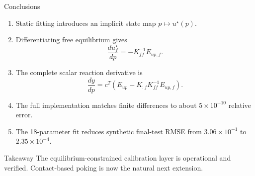 \documentclass[aspectratio=169,10pt]{beamer}
\newcommand{\Kff}{K_{\!ff}}
\newcommand{\Eup}{E_{up}}
\newcommand{\Eupf}{E_{up,f}}
\begin{document}
\begin{frame}{Conclusions}
  \small
  \begin{enumerate}
    \item Static fitting introduces an implicit state map
      $p\mapsto u^\star(p)$.
    \item Differentiating free equilibrium gives
      \[
        \frac{du_f^\star}{dp}=-\Kff^{-1}\Eupf.
      \]
    \item The complete scalar reaction derivative is
      \[
        \frac{dy}{dp}
        =
        c^T\left(\Eup-K_{:f}\Kff^{-1}\Eupf\right).
      \]
    \item The full implementation matches finite differences to about
      $5\times10^{-10}$ relative error.
    \item The 18-parameter fit reduces synthetic final-test RMSE from
      $3.06\times10^{-1}$ to $2.35\times10^{-4}$.
  \end{enumerate}

  \vspace{0.3em}
  \begin{block}{Takeaway}
    The equilibrium-constrained calibration layer is operational and
    verified. Contact-based poking is now the natural next extension.
  \end{block}
\end{frame}
\end{document}

